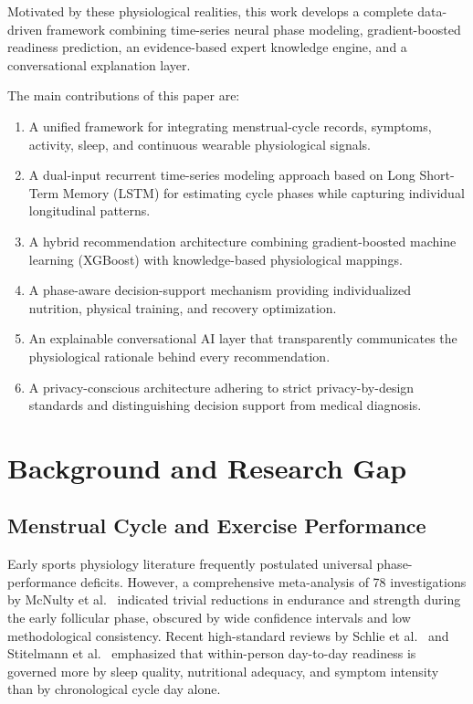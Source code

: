 \documentclass[conference]{IEEEtran}
\begin{document}
Motivated by these physiological realities, this work develops a complete data-driven framework combining time-series neural phase modeling, gradient-boosted readiness prediction, an evidence-based expert knowledge engine, and a conversational explanation layer.

The main contributions of this paper are:
\begin{enumerate}
    \item A unified framework for integrating menstrual-cycle records, symptoms, activity, sleep, and continuous wearable physiological signals.
    \item A dual-input recurrent time-series modeling approach based on Long Short-Term Memory (LSTM) for estimating cycle phases while capturing individual longitudinal patterns.
    \item A hybrid recommendation architecture combining gradient-boosted machine learning (XGBoost) with knowledge-based physiological mappings.
    \item A phase-aware decision-support mechanism providing individualized nutrition, physical training, and recovery optimization.
    \item An explainable conversational AI layer that transparently communicates the physiological rationale behind every recommendation.
    \item A privacy-conscious architecture adhering to strict privacy-by-design standards and distinguishing decision support from medical diagnosis.
\end{enumerate}

\section{Background and Research Gap}

\subsection{Menstrual Cycle and Exercise Performance}
Early sports physiology literature frequently postulated universal phase-performance deficits. However, a comprehensive meta-analysis of 78 investigations by McNulty et al.~\cite{mcnulty2020} indicated trivial reductions in endurance and strength during the early follicular phase, obscured by wide confidence intervals and low methodological consistency. Recent high-standard reviews by Schlie et al.~\cite{schlie2025} and Stitelmann et al.~\cite{stitelmann2026} emphasized that within-person day-to-day readiness is governed more by sleep quality, nutritional adequacy, and symptom intensity than by chronological cycle day alone.
\end{document}
